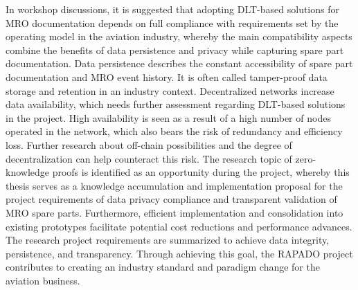 \begin{comment}
- hier die Opremic slides einarbeiten
- die use cases definieren (Bastis part)
\end{comment}
In workshop discussions, it is suggested that adopting DLT-based solutions for MRO documentation depends on full compliance with requirements set by the operating model in the aviation industry, whereby the main compatibility aspects combine the benefits of data persistence and privacy while capturing spare part documentation. Data persistence describes the constant accessibility of spare part documentation and MRO event history. It is often called tamper-proof data storage and retention in an industry context. Decentralized networks increase data availability, which needs further assessment regarding DLT-based solutions in the project. High availability is seen as a result of a high number of nodes operated in the network, which also bears the risk of redundancy and efficiency loss.
Further research about off-chain possibilities and the degree of decentralization can help counteract this risk. The research topic of zero-knowledge proofs is identified as an opportunity during the project, whereby this thesis serves as a knowledge accumulation and implementation proposal for the project requirements of data privacy compliance and transparent validation of MRO spare parts. Furthermore, efficient implementation and consolidation into existing prototypes facilitate potential cost reductions and performance advances. The research project requirements are summarized to achieve data integrity, persistence, and transparency. Through achieving this goal, the RAPADO project contributes to creating an industry standard and paradigm change for the aviation business.



\begin{comment}
-go thru zedel kliewer and list principles, say that zkps were one solution criteria mentioned already
-look further to semester project intros: 
(i) High speed of the system to not intervene with processes of part usage.
(ii) Consolidation of parts and certificates from different sources.
(iii) Persistence of data while operating in a trust-free and permission-based environment to secure anti-counterfeiting and confidentiality.

next:
-security and privacy
-transparency
- concepts for privacy identified: ZKP as one outcome of previous research for future research
- for this, three main requirements resulted: 1)knowledge accumulation 2)privacy vs transparency 3)digitization and data formats fit for purpose
--> use backings from project literature used also in semester project and jans publication
\end{comment}

